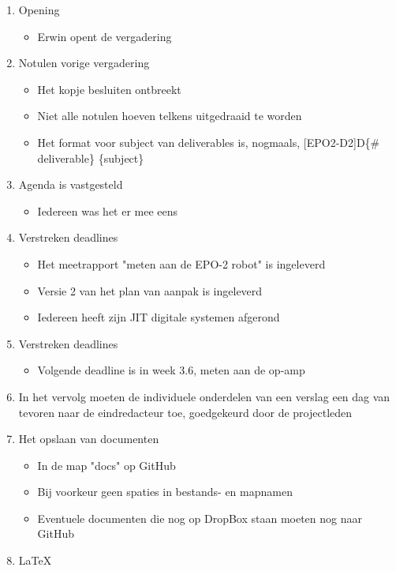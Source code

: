 \documentclass[dutch]{article}
\begin{document}
\begin{enumerate}
\item Opening

	\begin{itemize}
		\item Erwin opent de vergadering
	\end{itemize}
	\item Notulen vorige vergadering
	\begin{itemize}
		\item Het kopje besluiten ontbreekt
		\item Niet alle notulen hoeven telkens uitgedraaid te worden
		\item Het format voor subject van deliverables is, nogmaals, [EPO2-D2]D\{\# deliverable\} \{subject\}
	\end{itemize}
	\item Agenda is vastgesteld
	\begin{itemize}
		\item Iedereen was het er mee eens
	\end{itemize}
	\item Verstreken deadlines
	\begin{itemize}
		\item Het meetrapport "meten aan de EPO-2 robot" is ingeleverd
		\item Versie 2 van het plan van aanpak is ingeleverd
		\item Iedereen heeft zijn JIT digitale systemen afgerond
	\end{itemize}
	\item Verstreken deadlines
	\begin{itemize}
		\item Volgende deadline is in week 3.6, meten aan de op-amp
	\end{itemize}
	\item In het vervolg moeten de individuele onderdelen van een verslag een dag van tevoren naar de eindredacteur toe, goedgekeurd door de projectleden
	\item Het opslaan van documenten
	\begin{itemize}
		\item In de map "docs" op GitHub
		\item Bij voorkeur geen spaties in bestands- en mapnamen
		\item Eventuele documenten die nog op DropBox staan moeten nog naar GitHub
	\end{itemize}
	\item LaTeX
	\begin{itemize}

\end{itemize}
\end{enumerate}
\end{document}
